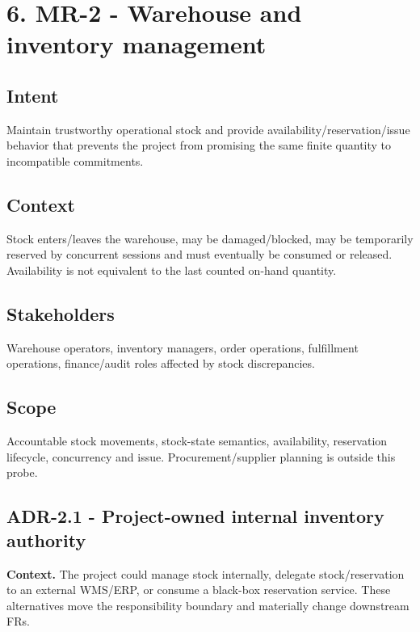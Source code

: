 \documentclass[
  10pt,
]{article}
\begin{document}
\section{6. MR-2 - Warehouse and inventory
management}\label{6-mr-2---warehouse-and-inventory-management}

\subsection{Intent}\label{intent-1}

Maintain trustworthy operational stock and provide
availability/reservation/issue behavior that prevents the project from
promising the same finite quantity to incompatible commitments.

\subsection{Context}\label{context-1}

Stock enters/leaves the warehouse, may be damaged/blocked, may be
temporarily reserved by concurrent sessions and must eventually be
consumed or released. Availability is not equivalent to the last counted
on-hand quantity.

\subsection{Stakeholders}\label{stakeholders-1}

Warehouse operators, inventory managers, order operations, fulfillment
operations, finance/audit roles affected by stock discrepancies.

\subsection{Scope}\label{scope-1}

Accountable stock movements, stock-state semantics, availability,
reservation lifecycle, concurrency and issue. Procurement/supplier
planning is outside this probe.

\subsection{ADR-2.1 - Project-owned internal inventory
authority}\label{adr-21---project-owned-internal-inventory-authority}

\textbf{Context.} The project could manage stock internally, delegate
stock/reservation to an external WMS/ERP, or consume a black-box
reservation service. These alternatives move the responsibility boundary
and materially change downstream FRs.
\end{document}
